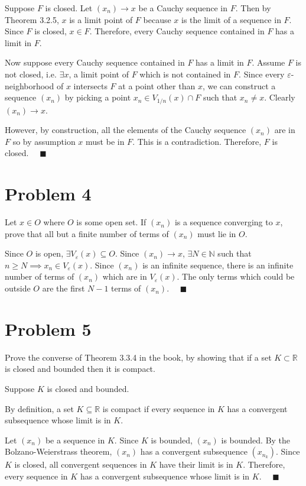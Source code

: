 \documentclass[12pt]{article}
\newcommand{\R}{\mathbb{R}}
\newcommand{\N}{\mathbb{N}}
\newcommand{\qed}{\quad \blacksquare}
\newcommand{\ep}{\varepsilon}
\begin{document}
        Suppose $F$ is closed. Let $(x_n) \to x$ be a Cauchy sequence in $F$. Then by Theorem 3.2.5, $x$ is a limit point of $F$ because $x$ is the limit of a sequence in $F$. Since $F$ is closed, $x \in F$. Therefore, every Cauchy sequence contained in $F$ has a limit in $F$.

        Now suppose every Cauchy sequence contained in $F$ has a limit in $F$. Assume $F$ is not closed, i.e. $\exists x$, a limit point of $F$ which is not contained in $F$. Since every $\ep$-neighborhood of $x$ intersects $F$ at a point other than $x$, we can construct a sequence $(x_n)$ by picking a point $x_n \in V_{1/n}(x) \cap F$ such that $x_n \neq x$. Clearly $(x_n) \to x$. 
        
        However, by construction, all the elements of the Cauchy sequence $(x_n)$ are in $F$ so by assumption $x$ must be in $F$. This is a contradiction. Therefore, $F$ is closed. $\qed$ 
    \color{black}



\pagebreak
\section*{Problem 4}

Let $x\in O$ where $O$ is some open set. If $(x_n)$ is a sequence converging to $x$, prove that all but a finite number of terms of $(x_n)$ must lie in $O$.

    \color{blue}
        Since $O$ is open, $\exists V_{\ep}(x) \subseteq O$. Since $(x_n) \to x$, $\exists N \in \N$ such that $n \geq N \implies x_n \in V_{\ep}(x)$. Since $(x_n)$ is an infinite sequence, there is an infinite number of terms of $(x_n)$ which are in $V_{\ep}(x)$. The only terms which could be outside $O$ are the first $N-1$ terms of $(x_n)$. $\qed$ 
    \color{black}

\pagebreak

\section*{Problem 5}
Prove the converse of Theorem 3.3.4 in the book, by showing that if a set $K\subset\mathbb{R}$ is closed and bounded then it is compact.

    \color{blue}
        Suppose $K$ is closed and bounded. 
        
        By definition, a set $K \subseteq \R$ is compact if every sequence in $K$ has a convergent subsequence whose limit is in $K$. 

        Let $(x_n)$ be a sequence in $K$. Since $K$ is bounded, $(x_n)$ is bounded. By the Bolzano-Weierstrass theorem, $(x_n)$ has a convergent subsequence $(x_{n_k})$. Since $K$ is closed, all convergent sequences in $K$ have their limit is in $K$. Therefore, every sequence in $K$ has a convergent subsequence whose limit is in $K$. $\qed$ 
    \color{black}
\end{document}
